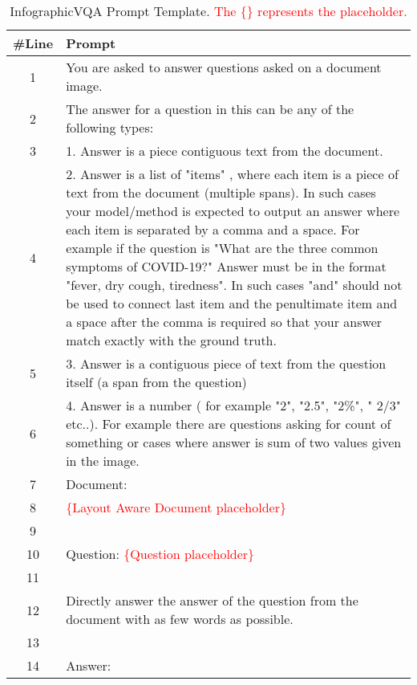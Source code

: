 \documentclass[letterpaper]{article} \usepackage{aaai24_preprint}  \usepackage{times}  \usepackage{helvet}  \usepackage{courier}  \usepackage[hyphens]{url}  \usepackage{graphicx} \urlstyle{rm} \def\UrlFont{\rm}  \usepackage{natbib}  \usepackage{caption} \frenchspacing  \setlength{\pdfpagewidth}{8.5in} \setlength{\pdfpageheight}{11in} \usepackage{algorithm}
\begin{document}
\begin{table*}[ht]
\small
\centering
\begin{tabular}{cl}
\toprule
\#Line& Prompt\\
\midrule
1& You are asked to answer questions asked on a document image.\\
2& The answer for a question in this can be any of the following types:\\
3& 1. Answer is a piece contiguous text from the document.\\
4& \parbox[c]{16cm}{2. Answer is a list of "items" , where each item is a piece of text from the document (multiple spans).
In such cases your model/method is expected to output an answer where each item is separated by a comma and a space.
For example if the question is "What are the three common symptoms of COVID-19?" Answer must be in the format "fever, dry cough, tiredness".
In such cases "and" should not be used to connect last item and the penultimate item and a space after the comma is required so that your answer match exactly with the ground truth.}\\
5& 3. Answer is a contiguous piece of text from the question itself (a span from the question)\\
6& \parbox[c]{16cm}{4. Answer is a number ( for example "2", "2.5", "2\%", " 2/3" etc..).
For example there are questions asking for count of something or cases where answer is sum of two values given in the image.}\\
7& Document:\\
8& \textcolor{red}{\{Layout Aware Document placeholder\}}\\
9& \\
10& Question: \textcolor{red}{\{Question placeholder\}}\\
11& \\
12& Directly answer the answer of the question from the document with as few words as possible.\\
13& \\
14& Answer:\\
\bottomrule
\end{tabular}
\caption{
InfographicVQA Prompt Template. \textcolor{red}{The \{\} represents the placeholder.}
}
\label{tab:infographicvqa_prompt}
\end{table*}
\end{document}
